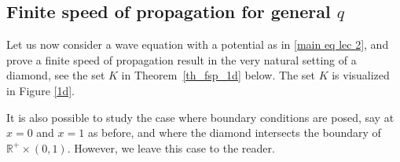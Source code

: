 \documentclass[12pt,oneside,final]{amsart}
\def\R{\mathbb R}
\begin{document}
\subsection{Finite speed of propagation for general $q$}

Let us now consider a wave equation with a potential as in \eqref{main eq lec 2}, and prove a finite speed of propagation result in the very natural setting of a diamond, see the set $K$ in Theorem~\ref{th_fsp_1d} below. 
The set $K$ is visualized in Figure \ref{1d}.

It is also possible to study the case where boundary conditions are posed, say at $x=0$ and $x=1$ as before, and where the diamond intersects the boundary of $\R^+ \times (0,1)$. However, we leave this case to the reader. 
\end{document}
